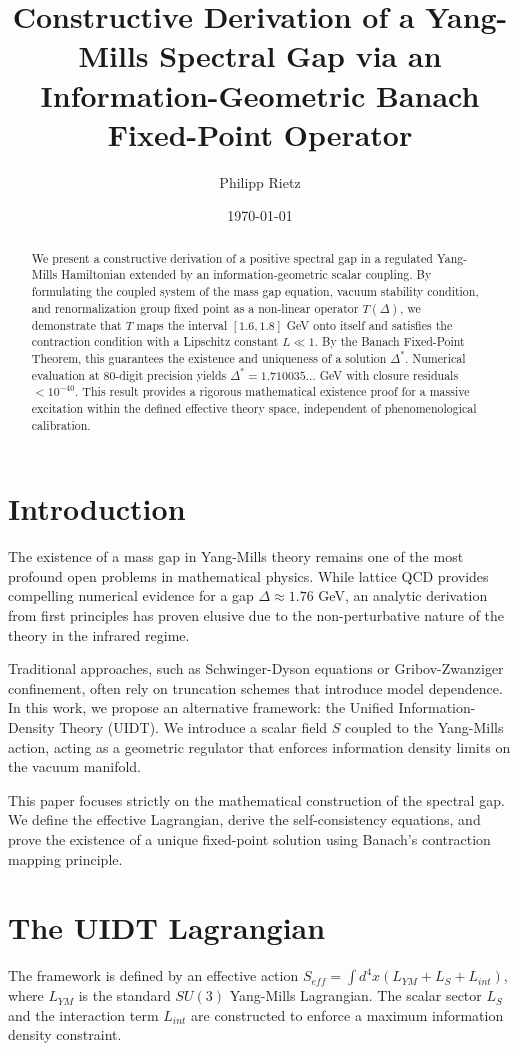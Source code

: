 \documentclass{article}
\title{Constructive Derivation of a Yang-Mills Spectral Gap via an Information-Geometric Banach Fixed-Point Operator}
\author{Philipp Rietz}
\date{\today}
\begin{document}
\maketitle

\begin{abstract}
We present a constructive derivation of a positive spectral gap in a regulated Yang-Mills Hamiltonian extended by an information-geometric scalar coupling. By formulating the coupled system of the mass gap equation, vacuum stability condition, and renormalization group fixed point as a non-linear operator $T(\Delta)$, we demonstrate that $T$ maps the interval $[1.6, 1.8]$ GeV onto itself and satisfies the contraction condition with a Lipschitz constant $L \ll 1$. By the Banach Fixed-Point Theorem, this guarantees the existence and uniqueness of a solution $\Delta^*$. Numerical evaluation at 80-digit precision yields $\Delta^* = 1.710035\dots$ GeV with closure residuals $< 10^{-40}$. This result provides a rigorous mathematical existence proof for a massive excitation within the defined effective theory space, independent of phenomenological calibration.
\end{abstract}

\section{Introduction}
The existence of a mass gap in Yang-Mills theory remains one of the most profound open problems in mathematical physics. While lattice QCD provides compelling numerical evidence for a gap $\Delta \approx 1.76$ GeV, an analytic derivation from first principles has proven elusive due to the non-perturbative nature of the theory in the infrared regime.

Traditional approaches, such as Schwinger-Dyson equations or Gribov-Zwanziger confinement, often rely on truncation schemes that introduce model dependence. In this work, we propose an alternative framework: the Unified Information-Density Theory (UIDT). We introduce a scalar field $S$ coupled to the Yang-Mills action, acting as a geometric regulator that enforces information density limits on the vacuum manifold.

This paper focuses strictly on the mathematical construction of the spectral gap. We define the effective Lagrangian, derive the self-consistency equations, and prove the existence of a unique fixed-point solution using Banach's contraction mapping principle.

\section{The UIDT Lagrangian}
The framework is defined by an effective action $S_{eff} = \int d^4x (L_{YM} + L_S + L_{int})$, where $L_{YM}$ is the standard $SU(3)$ Yang-Mills Lagrangian. The scalar sector $L_S$ and the interaction term $L_{int}$ are constructed to enforce a maximum information density constraint.
\end{document}
